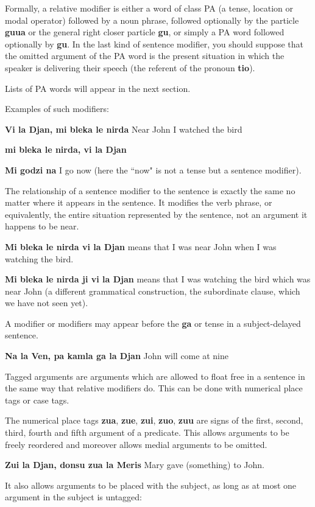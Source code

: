 \documentclass[12pt]{book}
\begin{document}
{Formally, a relative modifier is either a word of class PA (a tense, location or modal operator) followed by a noun phrase, followed optionally by the particle {\bf guua} or the general right closer particle {\bf gu}, or simply a PA word followed optionally by {\bf gu}.  In the last kind of sentence modifier, you should suppose that the omitted argument
of the PA word is the present situation in which the speaker is delivering their speech (the referent of the pronoun {\bf tio}).

Lists of PA words will appear in the next section.

Examples of such modifiers:

{\bf Vi la Djan, mi bleka le nirda}  Near John I watched the bird

{\bf mi bleka le nirda, vi la Djan}

{\bf Mi godzi na}  I go now (here the ``now" is not a tense but a sentence modifier).

The relationship of a sentence modifier to the sentence is exactly the same no matter where it appears in the sentence.  It modifies the verb phrase, or equivalently, the entire situation represented by the sentence, not an argument it happens to be near.

{\bf Mi bleka le nirda vi la Djan}  means that I was near John when I was watching the bird.  

{\bf Mi bleka le nirda ji vi la Djan}  means that I was watching the bird which was near John (a different grammatical construction, the subordinate clause, which we have not seen yet).

A modifier or modifiers may appear before the {\bf ga} or tense in a subject-delayed sentence.

{\bf Na la Ven, pa kamla ga la Djan}  John will come at nine

Tagged arguments are arguments which are allowed to float free in a sentence in the same way that relative modifiers do.  This can be done with numerical place tags or case tags.

The numerical place tags {\bf zua}, {\bf zue}, {\bf zui}, {\bf zuo}, {\bf zuu} are signs of the first, second, third, fourth and fifth argument of a predicate.  This allows
arguments to be freely reordered and moreover allows medial arguments to be omitted.

{\bf Zui la Djan, donsu zua la Meris}  Mary gave (something) to John.

It also allows arguments to be placed with the subject, as long as at most one argument in the subject is untagged:

}
\end{document}
